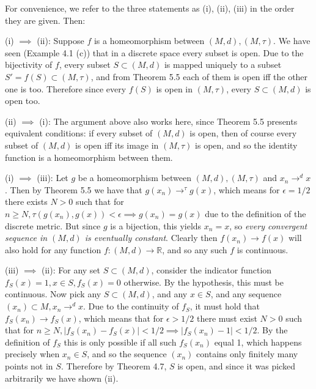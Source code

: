 \begin{solution}
    
    For convenience, we refer to the three statements as (i), (ii), (iii) in the order they are given.
    Then:

    (i) $\implies$ (ii): Suppose $f$ is a homeomorphism between $(M, d), (M, \tau)$.
    We have seen (Example 4.1 (c)) that in a discrete space every subset is open.
    Due to the bijectivity of $f$, every subset $S \subset (M, d)$ is mapped uniquely to a subset $S' = f(S) \subset (M, \tau)$, and from Theorem 5.5 each of them is open iff the other one is too.
    Therefore since every $f(S)$ is open in $(M, \tau)$, every $S \subset (M, d)$ is open too.

    (ii) $\implies$ (i): The argument above also works here, since Theorem 5.5 presents equivalent conditions: if every subset of $(M, d)$ is open, then of course every subset of $(M, d)$ is open iff its image in $(M, \tau)$ is open, and so the identity function is a homeomorphism between them.

    (i) $\implies$ (iii): Let $g$ be a homeomorphism between $(M, d), (M, \tau)$ and $x_n \rightarrow^{d} x$.
    Then by Theorem 5.5 we have that $g(x_n) \rightarrow^{\tau} g(x)$, which means for $\epsilon = 1/2$ there exists $N > 0$ such that for $n \geq N, \tau(g(x_n), g(x)) < \epsilon \implies g(x_n) = g(x)$ due to the definition of the discrete metric.
    But since $g$ is a bijection, this yields $x_n = x$, so \textit{every convergent sequence in $(M, d)$ is eventually constant}.
    Clearly then $f(x_n) \rightarrow f(x)$ will also hold for any function $f: (M, d) \rightarrow \mathbb{R}$, and so any such $f$ is continuous.

    (iii) $\implies$ (ii): For any set $S \subset (M, d)$, consider the indicator function $f_S(x) = 1, x \in S, f_S(x) = 0$ otherwise.
    By the hypothesis, this must be continuous.
    Now pick any $S \subset (M, d)$, and any $x \in S$, and any sequence $(x_n) \subset M, x_n \rightarrow^{d} x$.
    Due to the continuity of $f_S$, it must hold that $f_S(x_n) \rightarrow f_S(x)$, which means that for $\epsilon > 1/2$ there must exist $N > 0$ such that for $n \geq N, \lvert f_S(x_n) - f_S(x) \rvert < 1/2 \implies \lvert f_S(x_n) - 1 \rvert < 1/2$.
    By the definition of $f_S$ this is only possible if all such $f_S(x_n)$ equal 1, which happens precisely when $x_n \in S$, and so the sequence $(x_n)$ contains only finitely many points not in $S$.
    Therefore by Theorem 4.7, $S$ is open, and since it was picked arbitrarily we have shown (ii).

\end{solution}

